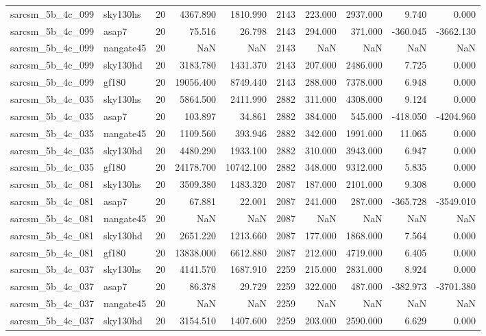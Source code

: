 \begin{tabular}{llrrrrrrrr}
sarcsm\_5b\_4c\_099 & sky130hs & 20 & 4367.890 & 1810.990 & 2143 & 223.000 & 2937.000 & 9.740 & 0.000 \\
sarcsm\_5b\_4c\_099 & asap7 & 20 & 75.516 & 26.798 & 2143 & 294.000 & 371.000 & -360.045 & -3662.130 \\
sarcsm\_5b\_4c\_099 & nangate45 & 20 & NaN & NaN & 2143 & NaN & NaN & NaN & NaN \\
sarcsm\_5b\_4c\_099 & sky130hd & 20 & 3183.780 & 1431.370 & 2143 & 207.000 & 2486.000 & 7.725 & 0.000 \\
sarcsm\_5b\_4c\_099 & gf180 & 20 & 19056.400 & 8749.440 & 2143 & 288.000 & 7378.000 & 6.948 & 0.000 \\
sarcsm\_5b\_4c\_035 & sky130hs & 20 & 5864.500 & 2411.990 & 2882 & 311.000 & 4308.000 & 9.124 & 0.000 \\
sarcsm\_5b\_4c\_035 & asap7 & 20 & 103.897 & 34.861 & 2882 & 384.000 & 545.000 & -418.050 & -4204.960 \\
sarcsm\_5b\_4c\_035 & nangate45 & 20 & 1109.560 & 393.946 & 2882 & 342.000 & 1991.000 & 11.065 & 0.000 \\
sarcsm\_5b\_4c\_035 & sky130hd & 20 & 4480.290 & 1933.100 & 2882 & 310.000 & 3943.000 & 6.947 & 0.000 \\
sarcsm\_5b\_4c\_035 & gf180 & 20 & 24178.700 & 10742.100 & 2882 & 348.000 & 9312.000 & 5.835 & 0.000 \\
sarcsm\_5b\_4c\_081 & sky130hs & 20 & 3509.380 & 1483.320 & 2087 & 187.000 & 2101.000 & 9.308 & 0.000 \\
sarcsm\_5b\_4c\_081 & asap7 & 20 & 67.881 & 22.001 & 2087 & 241.000 & 287.000 & -365.728 & -3549.010 \\
sarcsm\_5b\_4c\_081 & nangate45 & 20 & NaN & NaN & 2087 & NaN & NaN & NaN & NaN \\
sarcsm\_5b\_4c\_081 & sky130hd & 20 & 2651.220 & 1213.660 & 2087 & 177.000 & 1868.000 & 7.564 & 0.000 \\
sarcsm\_5b\_4c\_081 & gf180 & 20 & 13838.000 & 6612.880 & 2087 & 212.000 & 4719.000 & 6.405 & 0.000 \\
sarcsm\_5b\_4c\_037 & sky130hs & 20 & 4141.570 & 1687.910 & 2259 & 215.000 & 2831.000 & 8.924 & 0.000 \\
sarcsm\_5b\_4c\_037 & asap7 & 20 & 86.378 & 29.729 & 2259 & 322.000 & 487.000 & -382.973 & -3701.380 \\
sarcsm\_5b\_4c\_037 & nangate45 & 20 & NaN & NaN & 2259 & NaN & NaN & NaN & NaN \\
sarcsm\_5b\_4c\_037 & sky130hd & 20 & 3154.510 & 1407.600 & 2259 & 203.000 & 2590.000 & 6.629 & 0.000 \\

\end{tabular}
